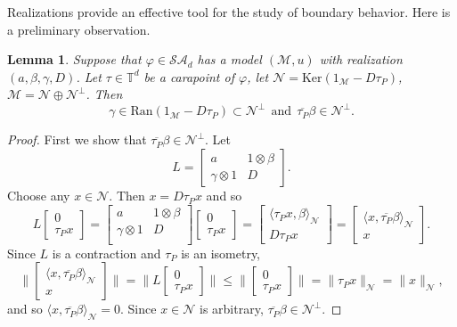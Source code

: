 \documentclass[11pt, reqno]{amsart}
\newtheorem{lemma}[theorem]{Lemma}
\newcommand\1{\boldsymbol {1}}
\numberwithin{equation}{section}
\begin{document}
Realizations provide an effective tool for the study of boundary behavior.  Here is a preliminary observation.
\begin{lemma}{}\label{gammainranperp}
Suppose that $\varphi\in \mathcal{SA}_{d}$ has a model $(\mathcal{M},u)$ with realization $(a,\beta, \gamma, D)$. Let $\tau \in \mathbb{T}^{d}$ be a carapoint of $\varphi$, let $\mathcal{N} = \mathrm{Ker}(1_{\mathcal{M}}-D\tau_{P})$, $\mathcal{M}=\mathcal{N}\oplus \mathcal{N}^{\perp}$. Then 
$$\gamma \in \mathrm{Ran}(1_{\mathcal{M}}-D\tau_{P}) \subset \mathcal{N}^{\perp}~~\text{and}~~ \overline{\tau_{P}}\beta \in \mathcal{N}^{\perp}.$$
\end{lemma}
\begin{proof}
First we show that $\overline{\tau_{P}}\beta\in\mathcal{N}^{\perp}$. Let 
$$L=\begin{bmatrix}
    a       & 1\otimes \beta \\
    \gamma \otimes 1       & D 
\end{bmatrix}.$$
Choose any $x\in\mathcal{N}$. Then $x=D\tau_{P} x$ and so
$$L\begin{bmatrix}
    0\\
    \tau_{P} x
\end{bmatrix}=  \begin{bmatrix}
                a & 1\otimes\beta \\
                \gamma\otimes 1 & D \\
                \end{bmatrix}\begin{bmatrix}
    0\\
    \tau_{P} x
\end{bmatrix}=\begin{bmatrix}
    \langle \tau_{P} x, \beta\rangle_{\mathcal{N}}\\
    D\tau_{P} x
\end{bmatrix}=\begin{bmatrix}
    \langle x, \overline{\tau_{P}}\beta\rangle_{\mathcal{N}}\\
    x
\end{bmatrix}.
$$
Since $L$ is a contraction and $\tau_{P}$ is an isometry, 
$$\Bigg\|\begin{bmatrix}
    \langle x, \overline{\tau_{P}}\beta\rangle_{\mathcal{N}}\\
    x
\end{bmatrix}\Bigg\|=\Bigg\|L\begin{bmatrix}
    0\\
    \tau_{P} x
\end{bmatrix}\Bigg\|\leq\Bigg\|\begin{bmatrix}
    0\\
    \tau_{P} x
\end{bmatrix}\Bigg\|=\|\tau_{P} x\|_{\mathcal{N}}=\|x\|_{\mathcal{N}},$$
and so $\langle x,\overline{\tau_{P}}\beta\rangle_{\mathcal{N}}=0$. Since $x\in\mathcal{N}$ is arbitrary, $\overline{\tau_{P}}\beta\in\mathcal{N}^{\perp}$.


\end{proof}
\end{document}
